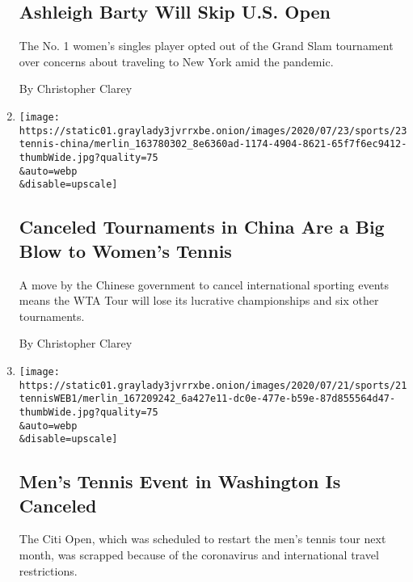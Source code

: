 \begin{enumerate}
  \hypertarget{ashleigh-barty-will-skip-us-open}{%
  \subsection{Ashleigh Barty Will Skip U.S.
  Open}\label{ashleigh-barty-will-skip-us-open}}

  The No. 1 women's singles player opted out of the Grand Slam
  tournament over concerns about traveling to New York amid the
  pandemic.

  By Christopher Clarey
\item
  \href{/2020/07/23/sports/tennis/wta-tour-china-tournaments-canceled.html}{}

  \texttt{[image: https://static01.graylady3jvrrxbe.onion/images/2020/07/23/sports/23tennis-china/merlin\_163780302\_8e6360ad-1174-4904-8621-65f7f6ec9412-thumbWide.jpg?quality=75\\\&auto=webp\\\&disable=upscale]}

  \hypertarget{canceled-tournaments-in-china-are-a-big-blow-to-womens-tennis}{%
  \subsection{Canceled Tournaments in China Are a Big Blow to Women's
  Tennis}\label{canceled-tournaments-in-china-are-a-big-blow-to-womens-tennis}}

  A move by the Chinese government to cancel international sporting
  events means the WTA Tour will lose its lucrative championships and
  six other tournaments.

  By Christopher Clarey
\item
  \href{/2020/07/21/sports/citi-open-washington-canceled.html}{}

  \texttt{[image: https://static01.graylady3jvrrxbe.onion/images/2020/07/21/sports/21tennisWEB1/merlin\_167209242\_6a427e11-dc0e-477e-b59e-87d855564d47-thumbWide.jpg?quality=75\\\&auto=webp\\\&disable=upscale]}

  \hypertarget{mens-tennis-event-in-washington-is-canceled}{%
  \subsection{Men's Tennis Event in Washington Is
  Canceled}\label{mens-tennis-event-in-washington-is-canceled}}

  The Citi Open, which was scheduled to restart the men's tennis tour
  next month, was scrapped because of the coronavirus and international
  travel restrictions.


\end{enumerate}

